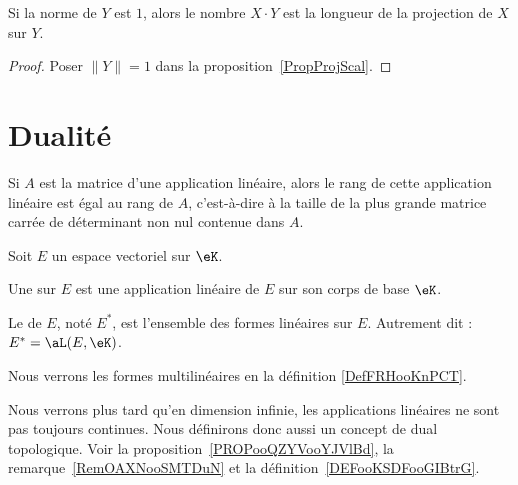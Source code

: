 \begin{corollary}
	Si la norme de \( Y\) est \( 1\), alors le nombre \( X\cdot Y\) est la longueur de la projection de \( X\) sur \( Y\).
\end{corollary}

\begin{proof}
	Poser \( \| Y \|=1\) dans la proposition~\ref{PropProjScal}.
\end{proof}

\section{Dualité}

\begin{proposition} \label{PropEJBZooTNFPRj}
	Si \( A\) est la matrice d'une application linéaire, alors le rang de cette application linéaire est égal au rang de \( A \), c'est-à-dire à la taille de la plus grande matrice carrée de déterminant non nul contenue dans \( A\).
\end{proposition}

\begin{definition}  \label{DefJPGSHpn}
	Soit \( E\) un espace vectoriel sur \( \eK\).

	Une  sur \( E \) est une application linéaire de \( E \) sur son corps de base \( \eK\).

	Le  de \( E\), noté \( E^*\), est l'ensemble des formes linéaires sur \( E\). Autrement dit : \( E^* = \aL(E,\eK)\).
\end{definition}
Nous verrons les formes multilinéaires en la définition \ref{DefFRHooKnPCT}.

Nous verrons plus tard qu'en dimension infinie, les applications linéaires ne sont pas toujours continues. Nous définirons donc aussi un concept de dual topologique. Voir la proposition~\ref{PROPooQZYVooYJVlBd}, la remarque~\ref{RemOAXNooSMTDuN} et la définition~\ref{DEFooKSDFooGIBtrG}.

